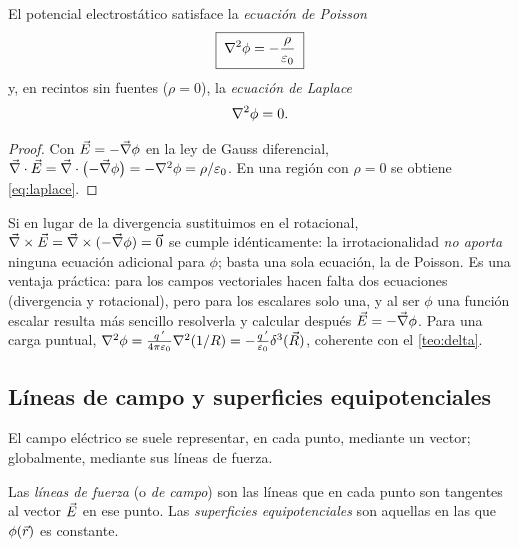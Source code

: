\begin{teorema}\label{teo:poisson}
El potencial electrostático satisface la \emph{ecuación de Poisson}
\begin{equation}\label{eq:poisson}
  \boxed{\;\nabla^{2}\phi=-\frac{\rho}{\varepsilon_{0}}\;}
\end{equation}
y, en recintos sin fuentes ($\rho=0$), la \emph{ecuación de Laplace}
\begin{equation}\label{eq:laplace}
  \nabla^{2}\phi=0 .
\end{equation}
\end{teorema}
\begin{proof}
Con $\vec{E}=-\vec{\nabla}\phi$ en la ley de Gauss diferencial,
$\vec{\nabla}\cdot\vec{E}=\vec{\nabla}\cdot\bigl(-\vec{\nabla}\phi\bigr)=-\nabla^{2}\phi=\rho/\varepsilon_{0}$. En una región con $\rho=0$ se obtiene \cref{eq:laplace}.
\end{proof}

Si en lugar de la divergencia sustituimos en el rotacional, $\vec{\nabla}\times\vec{E}=\vec{\nabla}\times(-\vec{\nabla}\phi)=\vec{0}$ se cumple idénticamente: la irrotacionalidad
\emph{no aporta} ninguna ecuación adicional para $\phi$; basta una sola ecuación, la de Poisson. Es una ventaja práctica: para los campos vectoriales
hacen falta dos ecuaciones (divergencia y rotacional), pero para los escalares solo una, y al ser $\phi$ una función escalar resulta más sencillo resolverla y
calcular después $\vec{E}=-\vec{\nabla}\phi$. Para una carga puntual, $\nabla^{2}\phi=\frac{q\,'}{4\pi\varepsilon_{0}}\nabla^{2}(1/R)=-\frac{q\,'}{\varepsilon_{0}}\delta^{3}(\vec{R})$, coherente con
el \cref{teo:delta}.

\subsection{Líneas de campo y superficies equipotenciales}\label{sec:lineas}
El campo eléctrico se suele representar, en cada punto, mediante un vector; globalmente, mediante sus líneas de fuerza.

\begin{definicion}\label{def:lineas}
Las \emph{líneas de fuerza} (o \emph{de campo}) son las líneas que en cada punto son tangentes al vector $\vec{E}$ en ese punto. Las
\emph{superficies equipotenciales} son aquellas en las que $\phi(\vec{r})$ es constante.
\end{definicion}


